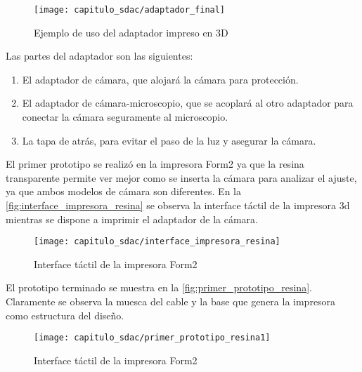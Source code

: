 \begin{figure}[H]
    \centering
    \texttt{[image: capitulo\_sdac/adaptador\_final]}
    \caption{Ejemplo de uso del adaptador impreso en 3D}\label{fig:adaptador_final}
\end{figure}

Las partes del adaptador son las siguientes:

\begin{enumerate}
    \item El adaptador de cámara, que alojará la cámara para protección.
    \item El adaptador de cámara-microscopio, que se acoplará al otro adaptador
    para conectar la cámara seguramente al microscopio.
    \item La tapa de atrás, para evitar el paso de la luz y asegurar la cámara.
\end{enumerate}

El primer prototipo se realizó en la impresora Form2 ya que la resina
transparente permite ver mejor como se inserta la cámara para analizar el
ajuste, ya que ambos modelos de cámara son diferentes. En la
\autoref{fig:interface_impresora_resina} se observa la interface táctil de la
impresora 3d mientras se dispone a imprimir el adaptador de la cámara.

\begin{figure}[H]
    \centering
    \texttt{[image: capitulo\_sdac/interface\_impresora\_resina]}
    \caption{Interface táctil de la impresora Form2}\label{fig:interface_impresora_resina}
\end{figure}


El prototipo terminado se muestra en la \autoref{fig:primer_prototipo_resina}.
Claramente se observa la muesca del cable y la base que genera la impresora como
estructura del diseño.

\begin{figure}[H]
    \centering
    \texttt{[image: capitulo\_sdac/primer\_prototipo\_resina1]}
    \caption{Interface táctil de la impresora Form2}\label{fig:primer_prototipo_resina}
\end{figure}

